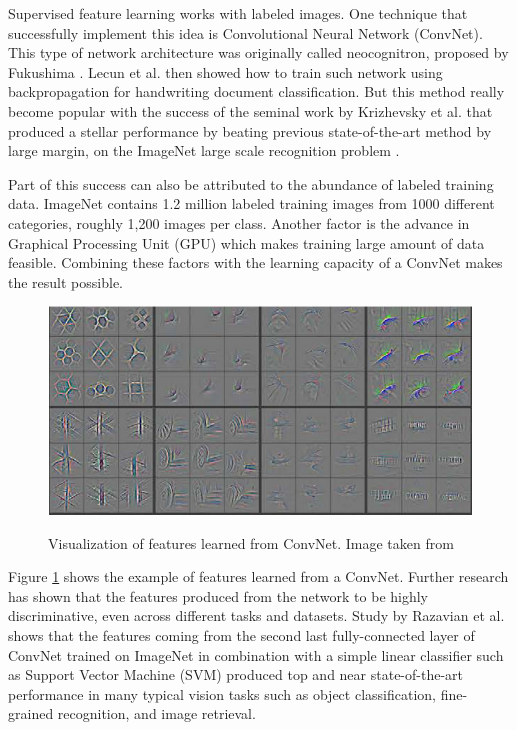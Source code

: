 \documentclass[a4paper,11pt]{kth-mag}
\begin{document}
Supervised feature learning works with labeled images. One technique that successfully implement this idea is Convolutional Neural Network (ConvNet). This type of network architecture was originally called neocognitron, proposed by Fukushima \cite{fukushima}. Lecun et al. \cite{lecunn1999} then showed how to train such network using backpropagation for handwriting document classification. But this method really become popular with the success of the seminal work by Krizhevsky et al. \cite{krizhevsky2012cnn} that produced a stellar performance by beating previous state-of-the-art method by large margin, on the ImageNet large scale recognition problem \cite{imagenet}. 

Part of this success can also be attributed to the abundance of labeled training data. ImageNet contains 1.2 million labeled training images from 1000 different categories, roughly 1,200 images per class. Another factor is the advance in Graphical Processing Unit (GPU) which makes training large amount of data feasible. Combining these factors with the learning capacity of a ConvNet makes the result possible.

\begin{figure}[h]
\centering
\includegraphics[scale=0.3]{image/cnn.png}
\label{fig:convnet_features}
\caption{Visualization of features learned from ConvNet. Image taken from \cite{zeiler}}
\end{figure}

Figure \ref{fig:convnet_features} shows the example of features learned from a ConvNet. Further research has shown that the features produced from the network to be highly discriminative, even across different tasks and datasets. Study by Razavian et al. \cite{razavian2014} shows that the features coming from the second last fully-connected layer of ConvNet trained on ImageNet in combination with a simple linear classifier such as Support Vector Machine (SVM) produced top and near state-of-the-art performance in many typical vision tasks such as object classification, fine-grained recognition, and image retrieval.
\end{document}
